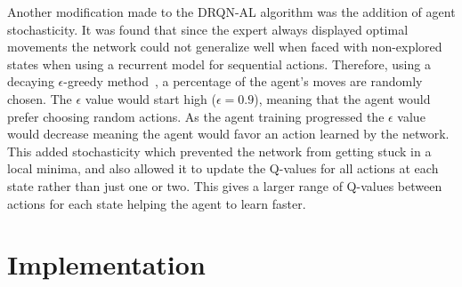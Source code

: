 \documentclass[12pt,american]{report}
\begin{document}
Another modification made to the DRQN-AL algorithm was the addition of agent stochasticity.  It was found that since the expert always displayed optimal movements the network could not generalize well when faced with non-explored states when using a recurrent model for sequential actions.  Therefore, using a decaying $\epsilon$-greedy method~\cite{Eden}, a percentage of the agent's moves are randomly chosen.  The $\epsilon$ value would start high ($\epsilon=0.9$), meaning that the agent would prefer choosing random actions.  As the agent training progressed the $\epsilon$ value would decrease meaning the agent would favor an action learned by the network. This added stochasticity which prevented the network from getting stuck in a local minima, and also allowed it to update the Q-values for all actions at each state rather than just one or two.  This gives a larger range of Q-values between actions for each state helping the agent to learn faster.

\chapter{Implementation}
\label{sec:implementation}
\end{document}
